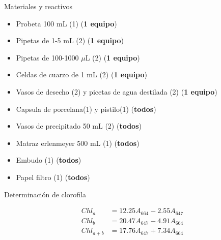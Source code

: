\documentclass[12pt, aspectratio=169]{beamer}
\begin{document}
	\begin{frame}
		Materiales y reactivos
		\begin{itemize}
			\item Probeta 100 mL (1) (\textbf{1 equipo})
			\item Pipetas de 1-5 mL (2) (\textbf{1 equipo})
			\item Pipetas de 100-1000 $\mu$L (2) (\textbf{1 equipo})
			\item Celdas de cuarzo de 1 mL (2) (\textbf{1 equipo})
			\item Vasos de desecho (2) y picetas de agua destilada (2) (\textbf{1 equipo})
			\item Capsula de porcelana(1) y pistilo(1) (\textbf{todos})
			\item Vasos de precipitado 50 mL (2) (\textbf{todos})
			\item Matraz erlenmeyer 500 mL (1) (\textbf{todos})
			\item Embudo (1) (\textbf{todos})
			\item Papel filtro (1) (\textbf{todos})
		\end{itemize}
	\end{frame}

	\begin{frame}
		Determinaci\'on de clorofila
		
		\begin{align}
			Chl_a &= 12.25A_{664} - 2.55A_{647} \\
			Chl_b &= 20.47A_{647} - 4.91A_{664} \\
			Chl_{a + b} &= 17.76A_{647} + 7.34A_{664}
		\end{align}
		
	\end{frame}
\end{document}
